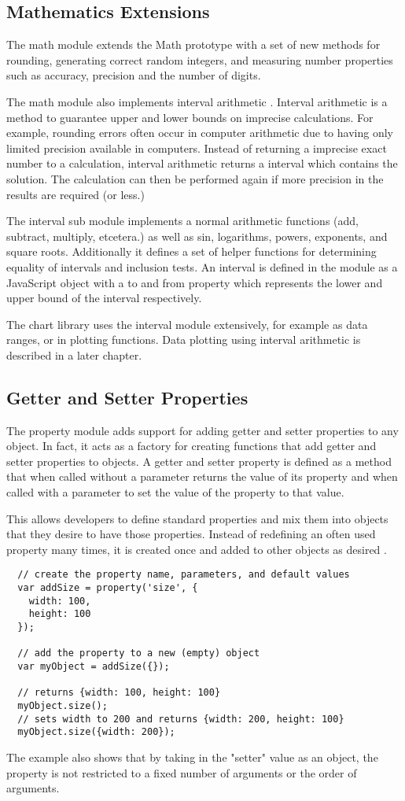 \subsection{Mathematics Extensions}
The math module extends the Math prototype with a set of new methods for rounding, generating correct random integers\cite{glassner90}, and measuring number properties such as accuracy, precision and the number of digits.

The math module also implements interval arithmetic \cite{rokne95}. Interval arithmetic is a method to guarantee upper and lower bounds on imprecise calculations. For example, rounding errors often occur in computer arithmetic due to having only limited precision available in computers. Instead of returning a imprecise exact number to a calculation, interval arithmetic returns a interval which contains the solution. The calculation can then be performed again if more precision in the results are required (or less.)

The interval sub module implements a normal arithmetic functions (add, subtract, multiply, etcetera.) as well as sin, logarithms, powers, exponents, and square roots. Additionally it defines a set of helper functions for determining equality of intervals and inclusion tests. An interval is defined in the module as a JavaScript object with a to and from property which represents the lower and upper bound of the interval respectively.

The chart library uses the interval module extensively, for example as data ranges, or in plotting functions. Data plotting using interval arithmetic is described in a later chapter.

\subsection{Getter and Setter Properties}
The property module adds support for adding getter and setter properties to any object. In fact, it acts as a factory for creating functions that add getter and setter properties to objects. A getter and setter property is defined as a method that when called without a parameter returns the value of its property and when called with a parameter to set the value of the property to that value.

This allows developers to define standard properties and mix them into objects that they desire to have those properties. Instead of redefining an often used property many times, it is created once and added to other objects as desired \cite{crockford08}.
\begin{verbatim}
  // create the property name, parameters, and default values
  var addSize = property('size', {
    width: 100,
    height: 100
  });

  // add the property to a new (empty) object
  var myObject = addSize({});

  // returns {width: 100, height: 100}
  myObject.size(); 
  // sets width to 200 and returns {width: 200, height: 100}
  myObject.size({width: 200});
\end{verbatim}
The example also shows that by taking in the "setter" value as an object, the property is not restricted to a fixed number of arguments or the order of arguments.

